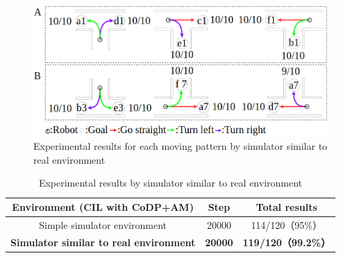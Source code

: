 \vspace{0.5cm}
\begin{figure}[hbtp]
  \centering
 \includegraphics[keepaspectratio, scale=0.35]
      {images/real_sim3.png}
 \caption{Experimental results for each moving pattern by simulator similar to real environment}
 \label{Fig:real_sim_res}
\end{figure} 

\begin{table}[hbtp]
  \caption{Experimental results by simulator similar to real environment}
  \label{table:real_sim}
  \centering
  \begin{tabular}{|c|c|c|}
    \hline
      Environment
      (CIL with CoDP+AM)
     & Step & Total results\\
    \hline
    Simple simulator environment & 20000 & 114/120（95\%）\\
    \hline
    \textbf{Simulator similar to real environment}
    & \textbf{20000} & \textbf{119/120（99.2\%）}\\
    \hline
  \end{tabular}
\end{table}


 


\newpage
